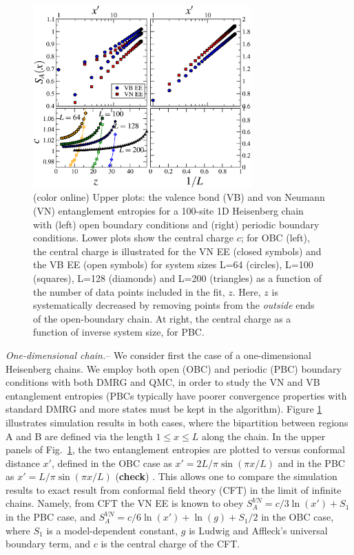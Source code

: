 \documentclass[prl,aps,twocolumn,floatfix,amsmath,amssymb,superscriptaddress,tightenlines]{revtex4}
\begin{document}
\begin{figure}
{
\includegraphics[width=3.3in]{4-panelFIG1.eps}
\caption{(color online) Upper plots: the valence bond (VB) and von Neumann (VN) entanglement entropies for a 100-site 1D Heisenberg chain with (left) open boundary conditions and (right) periodic boundary conditions.  Lower plots show the central charge $c$; for OBC (left), the central charge is illustrated for the VN EE (closed symbols) and the VB EE (open symbols) for system sizes L=64 (circles), L=100 (squares), L=128 (diamonds) and L=200 (triangles) as a function of the number of data points included in the fit, $z$.  Here, $z$ is systematically decreased by removing points from the {\it outside} ends of the open-boundary chain.  At right, the central charge as a function of inverse system size, for PBC.
\label{1D}}}
\end{figure}

{\it One-dimensional chain.}-- We consider first the case of a one-dimensional Heisenberg chains.  We employ both open (OBC) and periodic (PBC) boundary conditions with both DMRG and QMC, in order to study the VN and VB entanglement entropies (PBCs typically have poorer convergence properties with standard DMRG and more states must be kept in the algorithm).  Figure \ref{1D} illustrates simulation results in both cases, where the bipartition between regions A and B are defined via the length $1 \leq x \leq L$ along the chain.  In the upper panels of Fig.~\ref{1D}, the two entanglement entropies are plotted to versus conformal distance $x'$, defined in the OBC case as $x'=2L/\pi \sin(\pi x / L)$ and in the PBC as $x'=L/\pi \sin(\pi x / L)$ ({\bf check}) \cite{Cardy}.  This allows one to compare the simulation results to exact result from conformal field theory (CFT) in the limit of infinite chains.  Namely, from CFT the VN EE is known to obey $S^{VN}_A = c/3 \ln(x') + S_1$ in the PBC case, and $S^{VN}_A = c/6 \ln(x') + \ln(g)+S_1/2$ in the OBC case, where $S_1$ is a model-dependent constant, $g$ is Ludwig and Affleck's universal boundary term, and $c$ is the central charge of the CFT.
\end{document}
